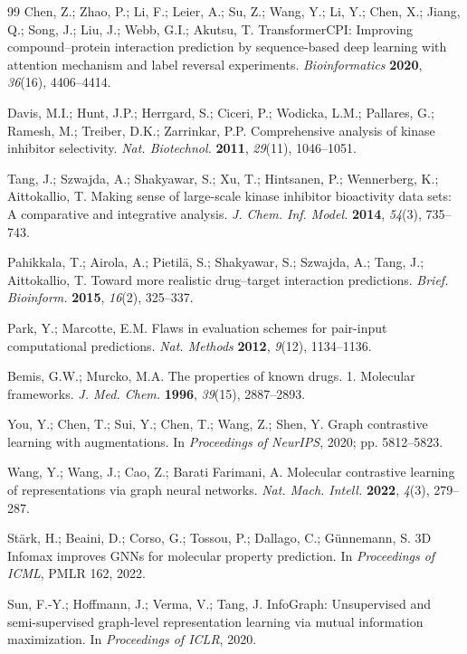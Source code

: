 \documentclass[10pt,a4paper,twocolumn]{article}
\begin{document}
\begin{thebibliography}{99}
Chen, Z.; Zhao, P.; Li, F.; Leier, A.; Su, Z.; Wang, Y.; Li, Y.; Chen, X.; Jiang, Q.; Song, J.; Liu, J.; Webb, G.I.; Akutsu, T. TransformerCPI: Improving compound--protein interaction prediction by sequence-based deep learning with attention mechanism and label reversal experiments. \textit{Bioinformatics} \textbf{2020}, \textit{36}(16), 4406--4414.


Davis, M.I.; Hunt, J.P.; Herrgard, S.; Ciceri, P.; Wodicka, L.M.; Pallares, G.; Ramesh, M.; Treiber, D.K.; Zarrinkar, P.P. Comprehensive analysis of kinase inhibitor selectivity. \textit{Nat. Biotechnol.} \textbf{2011}, \textit{29}(11), 1046--1051.


Tang, J.; Szwajda, A.; Shakyawar, S.; Xu, T.; Hintsanen, P.; Wennerberg, K.; Aittokallio, T. Making sense of large-scale kinase inhibitor bioactivity data sets: A comparative and integrative analysis. \textit{J. Chem. Inf. Model.} \textbf{2014}, \textit{54}(3), 735--743.


Pahikkala, T.; Airola, A.; Pietilä, S.; Shakyawar, S.; Szwajda, A.; Tang, J.; Aittokallio, T. Toward more realistic drug--target interaction predictions. \textit{Brief. Bioinform.} \textbf{2015}, \textit{16}(2), 325--337.


Park, Y.; Marcotte, E.M. Flaws in evaluation schemes for pair-input computational predictions. \textit{Nat. Methods} \textbf{2012}, \textit{9}(12), 1134--1136.


Bemis, G.W.; Murcko, M.A. The properties of known drugs. 1. Molecular frameworks. \textit{J. Med. Chem.} \textbf{1996}, \textit{39}(15), 2887--2893.


You, Y.; Chen, T.; Sui, Y.; Chen, T.; Wang, Z.; Shen, Y. Graph contrastive learning with augmentations. In \textit{Proceedings of NeurIPS}, 2020; pp. 5812--5823.


Wang, Y.; Wang, J.; Cao, Z.; Barati Farimani, A. Molecular contrastive learning of representations via graph neural networks. \textit{Nat. Mach. Intell.} \textbf{2022}, \textit{4}(3), 279--287.


Stärk, H.; Beaini, D.; Corso, G.; Tossou, P.; Dallago, C.; Günnemann, S. 3D Infomax improves GNNs for molecular property prediction. In \textit{Proceedings of ICML}, PMLR 162, 2022.


Sun, F.-Y.; Hoffmann, J.; Verma, V.; Tang, J. InfoGraph: Unsupervised and semi-supervised graph-level representation learning via mutual information maximization. In \textit{Proceedings of ICLR}, 2020.



\end{thebibliography}
\end{document}

